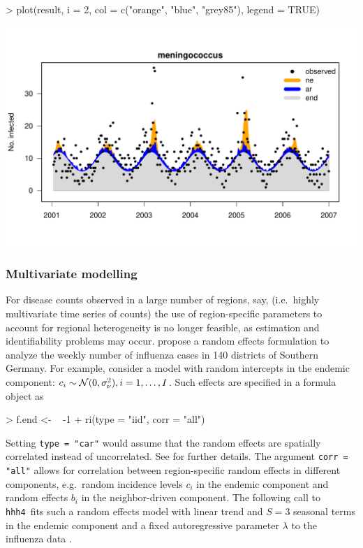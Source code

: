 \documentclass[a4paper,11pt]{article}
\newcommand{\n}{{\cal N}}
\newcommand{\code}[1]{\texttt{#1}}
\newcommand{\hhh}{\texttt{hhh4}}
\begin{document}
\begin{center}
\begin{Schunk}
\begin{Sinput}
> plot(result, i = 2, col = c("orange", "blue", "grey85"), legend = TRUE)
\end{Sinput}
\end{Schunk}
\includegraphics{figs/vignette_hhh4-fit_men}
\end{center}

\subsubsection{Multivariate modelling}

For disease counts observed in a large number of regions, say, (i.e.\
highly multivariate time series of counts) the use of region-specific 
parameters to account for regional heterogeneity is no longer feasible, 
as estimation and identifiability problems may occur. 
\cite{paul-held-2010} propose a random effects formulation to analyze the weekly
number of influenza cases in 140 districts of Southern Germany.
For example, consider a model with random intercepts in the endemic component: 
$c_i \sim \n(0,\sigma^2_\nu), i=1,\ldots,I$.
Such effects are specified in a formula object as
\begin{Schunk}
\begin{Sinput}
> f.end <- ~ -1 + ri(type = "iid", corr = "all")
\end{Sinput}
\end{Schunk}
Setting \code{type = "car"} would assume that the random effects are spatially 
correlated instead of uncorrelated. See \cite{paul-held-2010} for further details.
The argument \code{corr = "all"} allows for correlation between region-specific 
random effects in different components, e.g.\ random incidence levels $c_i$ 
in the endemic component and random effects $b_i$ in the neighbor-driven component.
The following call to \hhh\ fits such a random effects model with
linear trend and $S=3$ seasonal terms in the endemic component and
a fixed autoregressive parameter $\lambda$ to the influenza data 
\citep[cf. model B2 in Tab.~3 in][]{paul-held-2010}.
\end{document}
